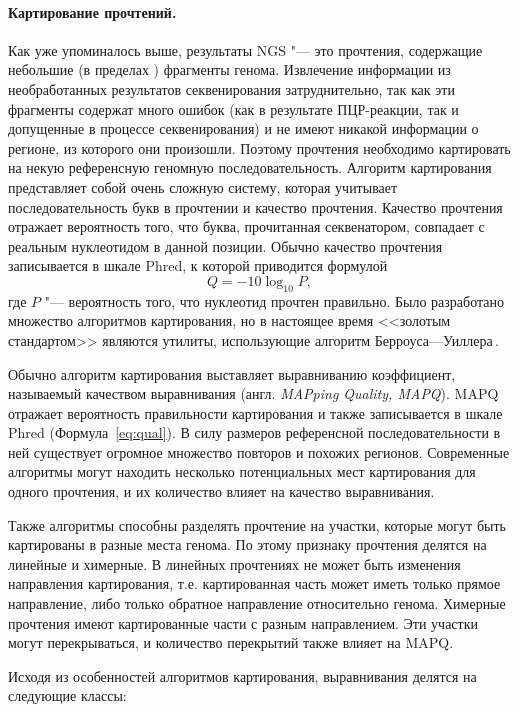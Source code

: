 \documentclass[a4paper,14pt]{extarticle}
\newcommand{\formularef}[1]{Формула~\ref{#1}}
\newcommand{\engterm}[1]{англ. \textenglish{\textit{#1}}}
\begin{document}
\paragraph{Картирование прочтений.}
Как уже упоминалось выше, результаты NGS "--- это прочтения, содержащие небольшие (в пределах ) фрагменты генома.
Извлечение информации из необработанных результатов секвенирования затруднительно, так как эти фрагменты содержат много ошибок (как в результате ПЦР\hyp{}реакции, так и допущенные в процессе секвенирования) и не имеют никакой информации о регионе, из которого они произошли.
Поэтому прочтения необходимо картировать на некую референсную геномную последовательность.
Алгоритм картирования представляет собой очень сложную систему, которая учитывает последовательность букв в прочтении и качество прочтения.
Качество прочтения отражает вероятность того, что буква, прочитанная секвенатором, совпадает с реальным нуклеотидом в данной позиции.
Обычно качество прочтения записывается в шкале Phred, к которой приводится формулой \begin{equation}Q = -10\log_{10}P,\label{eq:qual}\end{equation} где $P$ "--- вероятность того, что нуклеотид прочтен правильно.
Было разработано множество алгоритмов картирования, но в настоящее время <<золотым стандартом>> являются утилиты, использующие алгоритм Берроуса---Уиллера\,\citep{Burrows_1994}.

Обычно алгоритм картирования выставляет выравниванию коэффициент, называемый качеством выравнивания (\engterm{MAPping Quality, MAPQ}).
MAPQ отражает вероятность правильности картирования и также записывается в шкале Phred (\formularef{eq:qual}).
В силу размеров референсной последовательности в ней существует огромное множество повторов и похожих регионов.
Современные алгоритмы могут находить несколько потенциальных мест картирования для одного прочтения, и их количество влияет на качество выравнивания.

Также алгоритмы способны разделять прочтение на участки, которые могут быть картированы в разные места генома.
По этому признаку прочтения делятся на линейные и химерные.
В линейных прочтениях не может быть изменения направления картирования, т.е. картированная часть может иметь только прямое направление, либо только обратное направление относительно генома.
Химерные прочтения имеют картированные части с разным направлением.
Эти участки могут перекрываться, и количество перекрытий также влияет на MAPQ.

Исходя из особенностей алгоритмов картирования, выравнивания делятся на следующие классы:
\end{document}
